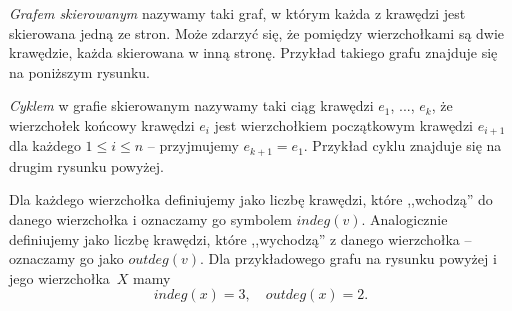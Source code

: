 


\noindent
\textit{Grafem skierowanym} nazywamy taki graf, w którym każda z krawędzi jest skierowana jedną ze stron. Może zdarzyć się, że pomiędzy wierzchołkami są dwie krawędzie, każda skierowana w inną stronę. Przykład takiego grafu znajduje się na poniższym rysunku.

\begin{center}
	\hspace{40px}
\end{center}

\noindent
\textit{Cyklem} w grafie skierowanym nazywamy taki ciąg krawędzi $e_1$, ..., $e_k$, że wierzchołek końcowy krawędzi $e_i$ jest wierzchołkiem początkowym krawędzi $e_{i + 1}$ dla każdego ${1 \leqslant i \leqslant n}$ -- przyjmujemy $e_{k + 1} = e_1$. Przykład cyklu znajduje się na drugim rysunku powyżej.

\vspace{5px}

\noindent
Dla każdego wierzchołka definiujemy  jako liczbę krawędzi, które ,,wchodzą'' do danego wierzchołka i oznaczamy go symbolem $indeg(v)$. Analogicznie definiujemy  jako liczbę krawędzi, które ,,wychodzą'' z danego wierzchołka -- oznaczamy go jako $outdeg(v)$. Dla przykładowego grafu na rysunku powyżej i jego wierzchołka~$X$ mamy
\[
	indeg(x) = 3,  \quad outdeg(x) = 2.
\]


